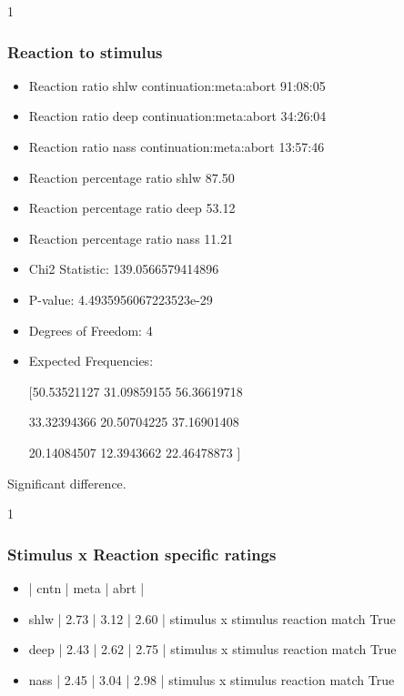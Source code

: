 1
\subsubsection{Reaction to stimulus}

\begin{itemize}
\item Reaction ratio shlw continuation:meta:abort 91:08:05
\item Reaction ratio deep continuation:meta:abort 34:26:04
\item Reaction ratio nass continuation:meta:abort 13:57:46
\end{itemize}

\begin{itemize}
\item Reaction percentage ratio shlw 87.50%
\item Reaction percentage ratio deep 53.12%
\item Reaction percentage ratio nass 11.21%
\end{itemize}

\begin{itemize}
\item Chi2 Statistic: 139.0566579414896
\item P-value: 4.4935956067223523e-29
\item Degrees of Freedom: 4
\item Expected Frequencies:
\item [[50.53521127 31.09859155 56.36619718]
\item [33.32394366 20.50704225 37.16901408]
\item [20.14084507 12.3943662  22.46478873]]
\end{itemize}

Significant difference.

1
\subsubsection{Stimulus x Reaction specific ratings}

\begin{itemize}
\item     | cntn | meta | abrt |
\item shlw | 2.73 | 3.12 | 2.60 | stimulus x stimulus reaction match True
\item deep | 2.43 | 2.62 | 2.75 | stimulus x stimulus reaction match True
\item nass | 2.45 | 3.04 | 2.98 | stimulus x stimulus reaction match True
\end{itemize}

